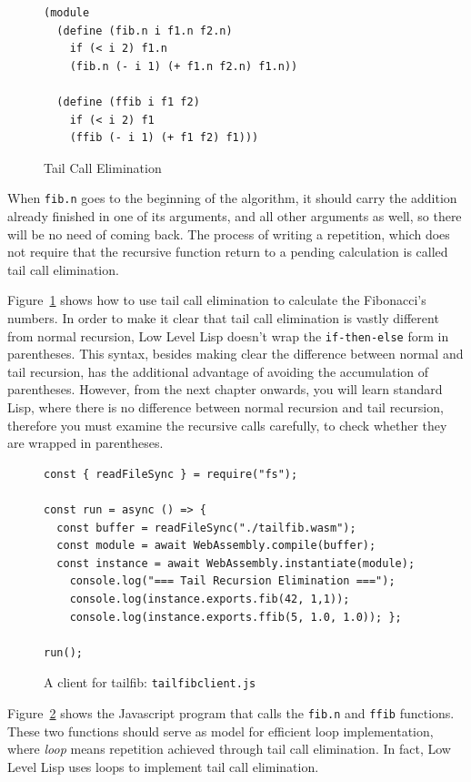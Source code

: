 \documentclass[a4paper,12pt]{book}
\begin{document}
\begin{figure}[!h]
\begin{verbatim}
(module
  (define (fib.n i f1.n f2.n)
    if (< i 2) f1.n
    (fib.n (- i 1) (+ f1.n f2.n) f1.n))

  (define (ffib i f1 f2)
    if (< i 2) f1
    (ffib (- i 1) (+ f1 f2) f1)))
\end{verbatim}
  \caption{Tail Call Elimination}
  \label{wasm:tailcall}
\end{figure}


When \verb|fib.n| goes to the
beginning of the algorithm, it should carry the
addition already finished in one of its arguments,
and all other arguments as well,
so there will be no need of coming back.
The process of writing a repetition, which does not
require that the recursive function return to
a pending calculation is called tail call elimination.

Figure~\ref{wasm:tailcall} shows how to use tail
call elimination to calculate the Fibonacci's numbers.
In order to make it clear that tail call elimination
is vastly different from normal recursion, Low Level
Lisp doesn't wrap the \verb|if-then-else| form in
parentheses. This syntax, besides making clear the
difference between normal and tail recursion,
has the additional advantage of avoiding the accumulation
of parentheses. However, from the next chapter onwards,
you will learn standard Lisp, where there is no difference
between normal recursion and tail recursion, therefore you
must examine the recursive calls carefully, to check
whether they are wrapped in parentheses.
\begin{figure}[!h]
\begin{verbatim}
const { readFileSync } = require("fs");

const run = async () => {
  const buffer = readFileSync("./tailfib.wasm");
  const module = await WebAssembly.compile(buffer);
  const instance = await WebAssembly.instantiate(module);
    console.log("=== Tail Recursion Elimination ===");
    console.log(instance.exports.fib(42, 1,1));
    console.log(instance.exports.ffib(5, 1.0, 1.0)); };

run();
\end{verbatim}
  \caption{A client for tailfib: {\tt tailfibclient.js}}
  \label{wasm:tailfibclient}
\end{figure}

Figure~\ref{wasm:tailfibclient} shows the Javascript
program that calls the \verb|fib.n| and \verb|ffib|
functions. These two functions should serve as model
for efficient loop implementation, where {\em loop}
means repetition achieved through tail call elimination.
In fact, Low Level Lisp uses loops to implement tail
call elimination.
\end{document}
